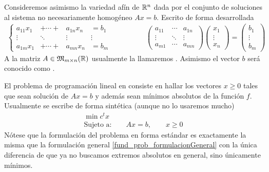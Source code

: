 Consideremos asimismo la variedad afín de $\mathbb{R}^n$ dada por el conjunto de soluciones al sistema no necesariamente homogéneo $Ax=b$. Escrito de forma desarrollada
\begin{equation*}
\begin{array}{cc}
\left\{\begin{array}{cccc}
a_{11}x_1&+\cdots+&a_{1n}x_n&=b_1\\
\vdots &\ddots &\vdots &\vdots\\
a_{1m}x_1&+\cdots+&a_{mn}x_n&=b_m
\end{array}\right.\qquad&\qquad\begin{pmatrix}
a_{11} & \cdots & a_{1n}\\
\vdots & \ddots & \vdots\\
a_{m1} & \cdots & a_{mn}
\end{pmatrix}\begin{pmatrix}
x_1\\
\vdots\\
x_n
\end{pmatrix}=\begin{pmatrix}
b_1\\
\vdots\\
b_m
\end{pmatrix}
\end{array}
\end{equation*}
A la matriz $A\in\mathfrak{M}_{m\times n}(\mathbb{R})$ usualmente la llamaremos . Asimismo el vector $b$ será conocido como .
\begin{prob}
El problema de programación lineal en  consiste en hallar los vectores $x\geq 0$ tales que sean solución de $Ax=b$ y además sean mínimos absolutos de la función $f$. Usualmente se escribe de forma sintética (aunque no lo usaremos mucho)
\begin{equation*}
\begin{array}{c}
\min c^tx\\
\text{Sujeto a:}\qquad Ax=b,\qquad x\geq 0
\end{array}
\end{equation*}
Nótese que la formulación del problema en forma estándar es exactamente la misma que la formulación general \ref{fund_prob_formulacionGeneral} con la única diferencia de que ya no buscamos extremos absolutos en general, sino únicamente mínimos. 
\end{prob}
